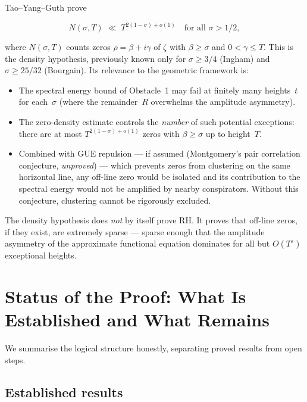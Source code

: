 \documentclass[12pt,a4paper]{article}
\begin{document}
\begin{enumerate}[label=\textbf{Obstacle \arabic*:},leftmargin=*,itemsep=1.5em]
Tao--Yang--Guth prove
\begin{mathblock}
\[
N(\sigma,T) \;\ll\; T^{2(1-\sigma) + o(1)} \quad \text{for all } \sigma > 1/2,
\]
\end{mathblock}
where $N(\sigma,T)$ counts zeros $\rho = \beta+i\gamma$ of $\zeta$ with $\beta \ge \sigma$ and $0 < \gamma \le T$. This is the density hypothesis, previously known only for $\sigma \ge 3/4$ (Ingham) and $\sigma \ge 25/32$ (Bourgain). Its relevance to the geometric framework is:
\begin{itemize}
\item The spectral energy bound of Obstacle~1 may fail at finitely many heights~$t$ for each~$\sigma$ (where the remainder~$R$ overwhelms the amplitude asymmetry).
\item The zero-density estimate controls the \emph{number} of such potential exceptions: there are at most $T^{2(1-\sigma)+o(1)}$ zeros with $\beta \ge \sigma$ up to height~$T$.
\item Combined with GUE repulsion --- if assumed (Montgomery's pair correlation conjecture, \emph{unproved}) --- which prevents zeros from clustering on the same horizontal line, any off-line zero would be isolated and its contribution to the spectral energy would not be amplified by nearby conspirators. Without this conjecture, clustering cannot be rigorously excluded.
\end{itemize}
The density hypothesis does \emph{not} by itself prove RH. It proves that off-line zeros, if they exist, are extremely sparse --- sparse enough that the amplitude asymmetry of the approximate functional equation dominates for all but $O(T^{\varepsilon})$ exceptional heights.

\end{enumerate}

\section{Status of the Proof: What Is Established and What Remains}
\label{sec:unified}

We summarise the logical structure honestly, separating proved results from open steps.

\subsection{Established results}
\end{document}
